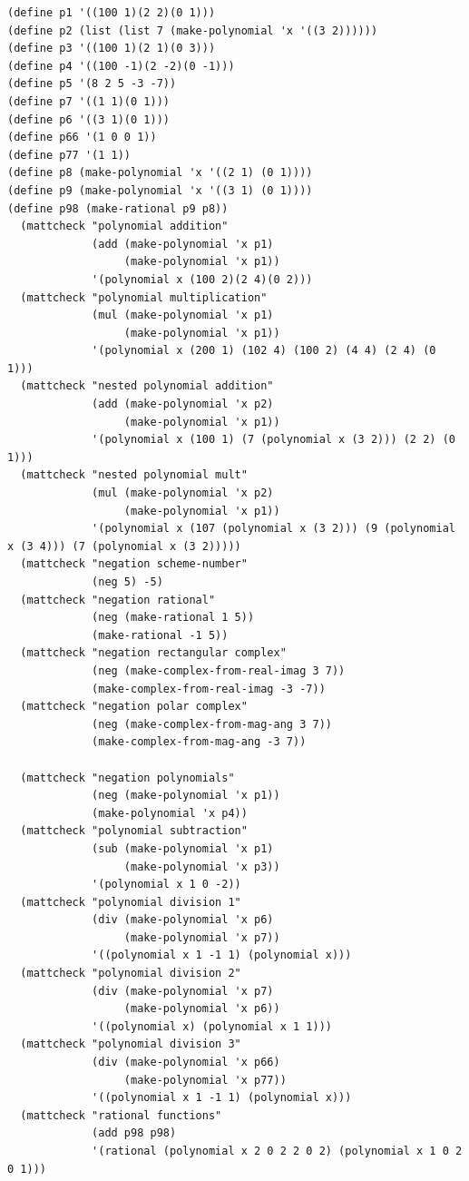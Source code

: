 \documentclass[final,fleqn,titlepage,twoside]{article}
\begin{document}
\begin{verbatim}
(define p1 '((100 1)(2 2)(0 1)))
(define p2 (list (list 7 (make-polynomial 'x '((3 2))))))
(define p3 '((100 1)(2 1)(0 3)))
(define p4 '((100 -1)(2 -2)(0 -1)))
(define p5 '(8 2 5 -3 -7))
(define p7 '((1 1)(0 1)))
(define p6 '((3 1)(0 1)))
(define p66 '(1 0 0 1))
(define p77 '(1 1))
(define p8 (make-polynomial 'x '((2 1) (0 1))))
(define p9 (make-polynomial 'x '((3 1) (0 1))))
(define p98 (make-rational p9 p8))
  (mattcheck "polynomial addition"
             (add (make-polynomial 'x p1)
                  (make-polynomial 'x p1))
             '(polynomial x (100 2)(2 4)(0 2)))
  (mattcheck "polynomial multiplication"
             (mul (make-polynomial 'x p1)
                  (make-polynomial 'x p1))
             '(polynomial x (200 1) (102 4) (100 2) (4 4) (2 4) (0 1)))
  (mattcheck "nested polynomial addition"
             (add (make-polynomial 'x p2)
                  (make-polynomial 'x p1))
             '(polynomial x (100 1) (7 (polynomial x (3 2))) (2 2) (0 1)))
  (mattcheck "nested polynomial mult"
             (mul (make-polynomial 'x p2)
                  (make-polynomial 'x p1))
             '(polynomial x (107 (polynomial x (3 2))) (9 (polynomial x (3 4))) (7 (polynomial x (3 2)))))
  (mattcheck "negation scheme-number"
             (neg 5) -5)
  (mattcheck "negation rational"
             (neg (make-rational 1 5))
             (make-rational -1 5))
  (mattcheck "negation rectangular complex"
             (neg (make-complex-from-real-imag 3 7))
             (make-complex-from-real-imag -3 -7))
  (mattcheck "negation polar complex"
             (neg (make-complex-from-mag-ang 3 7))
             (make-complex-from-mag-ang -3 7))

  (mattcheck "negation polynomials"
             (neg (make-polynomial 'x p1))
             (make-polynomial 'x p4))
  (mattcheck "polynomial subtraction"
             (sub (make-polynomial 'x p1)
                  (make-polynomial 'x p3))
             '(polynomial x 1 0 -2))
  (mattcheck "polynomial division 1"
             (div (make-polynomial 'x p6)
                  (make-polynomial 'x p7))
             '((polynomial x 1 -1 1) (polynomial x)))
  (mattcheck "polynomial division 2"
             (div (make-polynomial 'x p7)
                  (make-polynomial 'x p6))
             '((polynomial x) (polynomial x 1 1)))
  (mattcheck "polynomial division 3"
             (div (make-polynomial 'x p66)
                  (make-polynomial 'x p77))
             '((polynomial x 1 -1 1) (polynomial x)))
  (mattcheck "rational functions"
             (add p98 p98)
             '(rational (polynomial x 2 0 2 2 0 2) (polynomial x 1 0 2 0 1)))
\end{verbatim}
\end{document}
